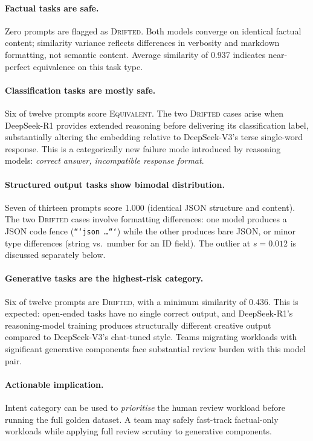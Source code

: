 \documentclass[11pt,a4paper]{article}
\begin{document}
\paragraph{Factual tasks are safe.}
Zero prompts are flagged as \textsc{Drifted}.
Both models converge on identical factual content; similarity variance reflects
differences in verbosity and markdown formatting, not semantic content.
Average similarity of 0.937 indicates near-perfect equivalence on this task type.

\paragraph{Classification tasks are mostly safe.}
Six of twelve prompts score \textsc{Equivalent}.
The two \textsc{Drifted} cases arise when DeepSeek-R1 provides extended
reasoning before delivering its classification label, substantially altering
the embedding relative to DeepSeek-V3's terse single-word response.
This is a categorically new failure mode introduced by reasoning models:
\emph{correct answer, incompatible response format}.

\paragraph{Structured output tasks show bimodal distribution.}
Seven of thirteen prompts score 1.000 (identical JSON structure and content).
The two \textsc{Drifted} cases involve formatting differences: one model
produces a JSON code fence (\texttt{```json \ldots ```}) while the other
produces bare JSON, or minor type differences (string vs.\ number for an ID field).
The outlier at $s = 0.012$ is discussed separately below.

\paragraph{Generative tasks are the highest-risk category.}
Six of twelve prompts are \textsc{Drifted}, with a minimum similarity of 0.436.
This is expected: open-ended tasks have no single correct output, and DeepSeek-R1's
reasoning-model training produces structurally different creative output compared
to DeepSeek-V3's chat-tuned style.
Teams migrating workloads with significant generative components face substantial
review burden with this model pair.

\paragraph{Actionable implication.}
Intent category can be used to \emph{prioritise} the human review workload before
running the full golden dataset.
A team may safely fast-track factual-only workloads while applying full review
scrutiny to generative components.
\end{document}
